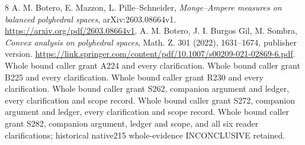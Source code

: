 \documentclass[11pt]{article}
\begin{document}
\begin{thebibliography}{8}
 A. M. Botero, E. Mazzon, L. Pille--Schneider, \emph{Monge--Ampere measures on balanced polyhedral spaces}, arXiv:2603.08664v1. \url{https://arxiv.org/pdf/2603.08664v1}.
 A. M. Botero, J. I. Burgos Gil, M. Sombra, \emph{Convex analysis on polyhedral spaces}, Math. Z. 301 (2022), 1631--1674, publisher version. \url{https://link.springer.com/content/pdf/10.1007/s00209-021-02869-6.pdf}.
 Whole bound caller grant A224 and every clarification.
 Whole bound caller grant B225 and every clarification.
 Whole bound caller grant R230 and every clarification.
 Whole bound caller grant S262, companion argument and ledger, every clarification and scope record.
 Whole bound caller grant S272, companion argument and ledger, every clarification and scope record.
 Whole bound caller grant S282, companion argument, ledger and scope, and all six reader clarifications; historical native215 whole-evidence INCONCLUSIVE retained.
\end{thebibliography}
\end{document}

